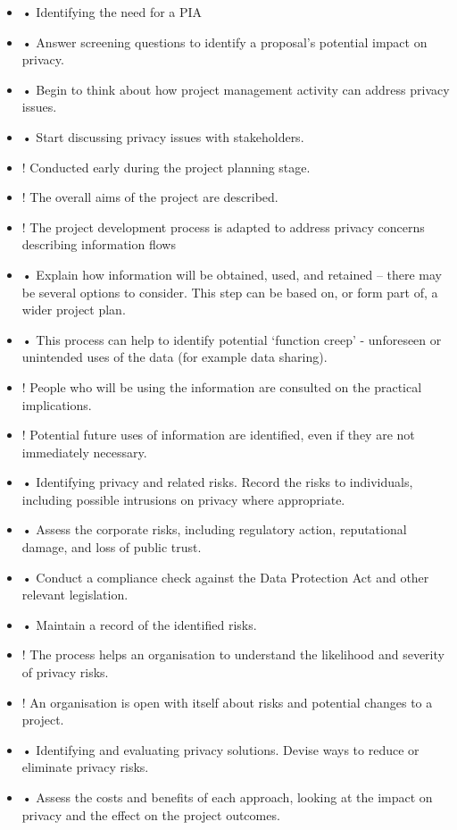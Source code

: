 \documentclass{article}
\begin{document}
\begin{itemize}
\item • Identifying the need for a PIA
\item • Answer screening questions to identify a proposal’s potential impact on privacy.
\item • Begin to think about how project management activity can address privacy issues.
\item • Start discussing privacy issues with stakeholders.
\item ! Conducted early during the project planning stage.
\item ! The overall aims of the project are described.
\item ! The project development process is adapted to address privacy concerns describing information flows
\item • Explain how information will be obtained, used, and retained – there may be several options to consider. This step can be based on, or form part of, a wider project plan.
\item • This process can help to identify potential ‘function creep’ - unforeseen or unintended uses of the data (for example data sharing).
\item ! People who will be using the information are consulted on the practical implications.
\item ! Potential future uses of information are identified, even if they are not immediately necessary.
\item • Identifying privacy and related risks. Record the risks to individuals, including possible intrusions on privacy where appropriate.
\item • Assess the corporate risks, including regulatory action, reputational damage, and loss of public trust.
\item • Conduct a compliance check against the Data Protection Act and other relevant legislation.
\item • Maintain a record of the identified risks. 
\item ! The process helps an organisation to understand the likelihood and severity of privacy risks. 
\item ! An organisation is open with itself about risks and potential changes to a project.
\item •  Identifying and evaluating privacy solutions. Devise ways to reduce or eliminate privacy risks.
\item • Assess the costs and benefits of each approach, looking at the impact on privacy and the effect on the project outcomes.

\end{itemize}
\end{document}
